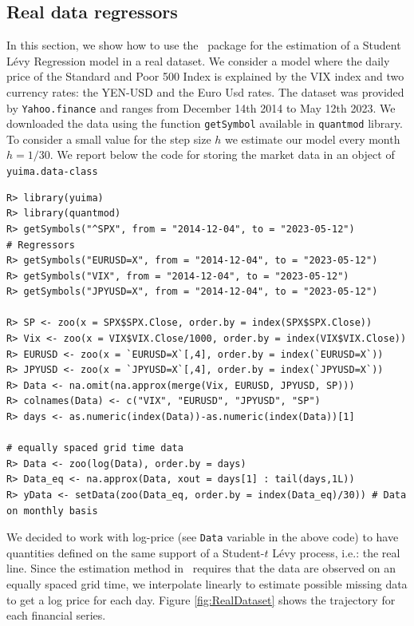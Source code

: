 \subsection{Real data regressors}\label{real-data-regressors}

In this section, we show how to use the  ~package for the estimation of a Student Lévy Regression model in a real dataset. We consider a model where the daily price of the Standard and Poor 500 Index is explained by the VIX index and two currency rates: the YEN-USD and the Euro Usd rates. The dataset was provided by \texttt{Yahoo.finance} and ranges from
December 14th 2014 to May 12th 2023. We downloaded the data using the function \texttt{getSymbol} available in \texttt{quantmod} library. To consider a small value for the step size \(h\) we estimate our model every month \(h=1/30\). We report below the code for storing the market data in an object of \texttt{yuima.data-class}

\begin{verbatim}
R> library(yuima)
R> library(quantmod)
R> getSymbols("^SPX", from = "2014-12-04", to = "2023-05-12")
# Regressors
R> getSymbols("EURUSD=X", from = "2014-12-04", to = "2023-05-12")
R> getSymbols("VIX", from = "2014-12-04", to = "2023-05-12")
R> getSymbols("JPYUSD=X", from = "2014-12-04", to = "2023-05-12")

R> SP <- zoo(x = SPX$SPX.Close, order.by = index(SPX$SPX.Close))
R> Vix <- zoo(x = VIX$VIX.Close/1000, order.by = index(VIX$VIX.Close))
R> EURUSD <- zoo(x = `EURUSD=X`[,4], order.by = index(`EURUSD=X`))
R> JPYUSD <- zoo(x = `JPYUSD=X`[,4], order.by = index(`JPYUSD=X`))
R> Data <- na.omit(na.approx(merge(Vix, EURUSD, JPYUSD, SP)))
R> colnames(Data) <- c("VIX", "EURUSD", "JPYUSD", "SP")
R> days <- as.numeric(index(Data))-as.numeric(index(Data))[1]

# equally spaced grid time data
R> Data <- zoo(log(Data), order.by = days)
R> Data_eq <- na.approx(Data, xout = days[1] : tail(days,1L))
R> yData <- setData(zoo(Data_eq, order.by = index(Data_eq)/30)) # Data on monthly basis
\end{verbatim}

We decided to work with log-price (see \texttt{Data} variable in the above code) to have quantities defined on the same support of a Student-\(t\) Lévy process, i.e.: the real line. Since the estimation method in  ~requires that the data are observed on an equally spaced grid time, we interpolate linearly to estimate possible missing data to get a log price for each day. Figure \ref{fig:RealDataset} shows the trajectory for each financial series.


